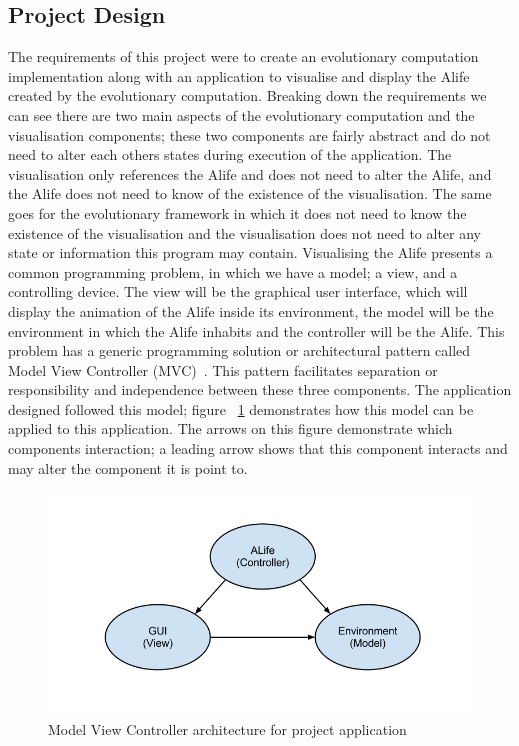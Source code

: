 \documentclass[12pt]{article}
\begin{document}
\subsection{Project Design}
The requirements of this project were to create an evolutionary computation implementation along with an application to visualise and
display the Alife created by the evolutionary computation. Breaking down the requirements we can see there are two main aspects
of the evolutionary computation and the visualisation components; these two components are fairly abstract and do not need to alter
each others states during execution of the application. The visualisation only references the Alife and does not need to alter
the Alife, and the Alife does not need to know of the existence of the visualisation. The same goes for the evolutionary framework
in which it does not need to know the existence of the visualisation and the visualisation does not need to alter any state or
information this program may contain. Visualising the Alife presents a common programming problem, in which we have a model; a view, and a controlling
device. The view will be the graphical user interface, which will display the animation of the Alife inside its environment, the 
model will be the environment in which the Alife inhabits and the controller will be the Alife. This problem has a generic programming
solution or architectural pattern called Model View Controller (MVC)~\cite{fowler03}. This pattern facilitates separation or responsibility
and independence between these three components. The application designed followed this model; figure ~\ref{fig:mvc} demonstrates 
how this model can be applied to this application. The arrows on this figure demonstrate which components interaction; a leading arrow
shows that this component interacts and may alter the component it is point to.

\begin{figure} [ht]
\centering
\includegraphics[scale = 0.5]{mvc.png}
\caption{Model View Controller architecture for project application}
\label{fig:mvc}
\end{figure}
\end{document}
